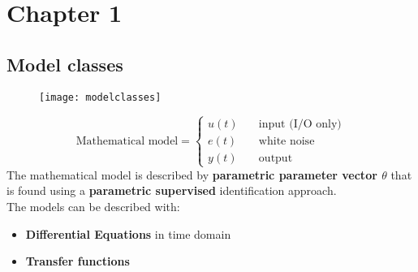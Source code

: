 \section{Chapter 1}
\subsection{Model classes}
\begin{figure}[!h]
  \centering
  \texttt{[image: modelclasses]}
\end{figure}
\[ \text{Mathematical model} =
\begin{cases}
	u(t) & \quad \text{input (I/O only)}\\
	e(t) & \quad \text{white noise}\\
	y(t) & \quad \text{output}
\end{cases}
\]
The mathematical model is described by \textbf{parametric parameter vector $\theta$ }that is found using a \textbf{parametric supervised} identification approach.\\
The models can be described with:
\begin{itemize}
\item \textbf{Differential Equations} in time domain
\item \textbf{Transfer functions}
\end{itemize}

